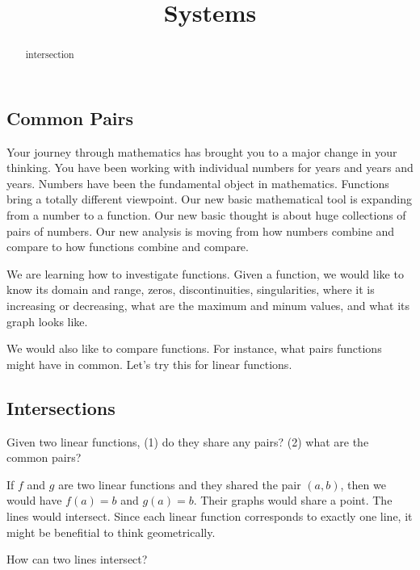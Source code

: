 \documentclass{ximera}
\title{Systems}
\begin{document}
\begin{abstract}
intersection
\end{abstract}
\maketitle



\subsection*{Common Pairs}

Your journey through mathematics has brought you to a major change in your thinking. You have been working with individual numbers for years and years and years. Numbers have been the fundamental object in mathematics. Functions bring a totally different viewpoint. Our new basic mathematical tool is expanding from a number to a function.  Our new basic thought is about huge collections of pairs of numbers.  Our new analysis is moving from how numbers combine and compare to how functions combine and compare.

We are learning how to investigate functions.  Given a function, we would like to know its domain and range, zeros, discontinuities, singularities, where it is increasing or decreasing, what are the maximum and minum values, and what its graph looks like.

We would also like to compare functions.  For instance, what pairs functions might have in common. Let's try this for linear functions.



\subsection*{Intersections}

Given two linear functions, (1) do they share any pairs? (2) what are the common pairs?



If $f$ and $g$ are two linear functions and they shared the pair $(a, b)$, then we would have $f(a)=b$ and $g(a)=b$.  Their graphs would share a point. The lines would intersect. Since each linear function corresponds to exactly one line, it might be benefitial to think geometrically.  

How can two lines intersect?
\end{document}
